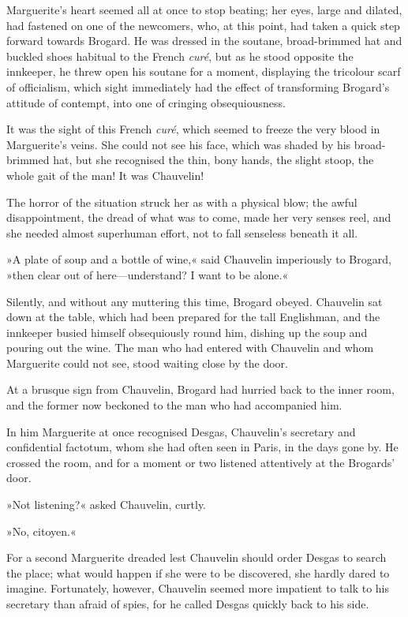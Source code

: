Marguerite's heart seemed all at once to stop beating; her eyes, large and dilated, had fastened on one of the newcomers, who, at this point, had taken a quick step forward towards Brogard. He was dressed in the soutane, broad-brimmed hat and buckled shoes habitual to the French \textit{curé}, but as he stood opposite the innkeeper, he threw open his soutane for a moment, displaying the tricolour scarf of officialism, which sight immediately had the effect of transforming Brogard's attitude of contempt, into one of cringing obsequiousness.

It was the sight of this French \textit{curé}, which seemed to freeze the very blood in Marguerite's veins. She could not see his face, which was shaded by his broad-brimmed hat, but she recognised the thin, bony hands, the slight stoop, the whole gait of the man! It was Chauvelin!

The horror of the situation struck her as with a physical blow; the awful disappointment, the dread of what was to come, made her very senses reel, and she needed almost superhuman effort, not to fall senseless beneath it all.

»A plate of soup and a bottle of wine,« said Chauvelin imperiously to Brogard, »then clear out of here\allowbreak---\allowbreak understand? I want to be alone.«

Silently, and without any muttering this time, Brogard obeyed. Chauvelin sat down at the table, which had been prepared for the tall Englishman, and the innkeeper busied himself obsequiously round him, dishing up the soup and pouring out the wine. The man who had entered with Chauvelin and whom Marguerite could not see, stood waiting close by the door.

At a brusque sign from Chauvelin, Brogard had hurried back to the inner room, and the former now beckoned to the man who had accompanied him.

In him Marguerite at once recognised Desgas, Chauvelin's secretary and confidential factotum, whom she had often seen in Paris, in the days gone by. He crossed the room, and for a moment or two listened attentively at the Brogards' door.

»Not listening?« asked Chauvelin, curtly.

»No, citoyen.«

For a second Marguerite dreaded lest Chauvelin should order Desgas to search the place; what would happen if she were to be discovered, she hardly dared to imagine. Fortunately, however, Chauvelin seemed more impatient to talk to his secretary than afraid of spies, for he called Desgas quickly back to his side.

